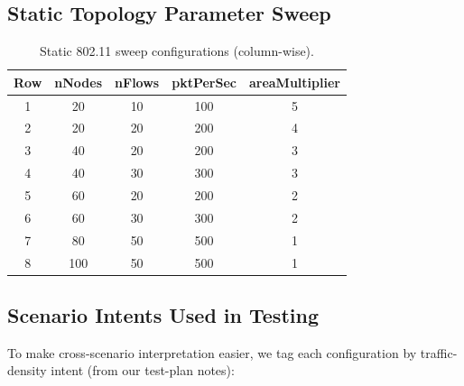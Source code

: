 \documentclass[11pt,a4paper]{article}
\begin{document}
\subsection{Static Topology Parameter Sweep}

\begin{table}[h]
\centering
\caption{Static 802.11 sweep configurations (column-wise).}
\label{tab:sweep-static}
\small
\begin{tabular}{c c c c c}
\toprule
\textbf{Row} & \textbf{nNodes} & \textbf{nFlows} & \textbf{pktPerSec} & \textbf{areaMultiplier} \\
\midrule
1 & 20  & 10 & 100 & 5 \\
2 & 20  & 20 & 200 & 4 \\
3 & 40  & 20 & 200 & 3 \\
4 & 40  & 30 & 300 & 3 \\
5 & 60  & 20 & 200 & 2 \\
6 & 60  & 30 & 300 & 2 \\
7 & 80  & 50 & 500 & 1 \\
8 & 100 & 50 & 500 & 1 \\
\bottomrule
\end{tabular}
\end{table}

\subsection{Scenario Intents Used in Testing}

To make cross-scenario interpretation easier, we tag each configuration by
traffic-density intent (from our test-plan notes):
\end{document}
